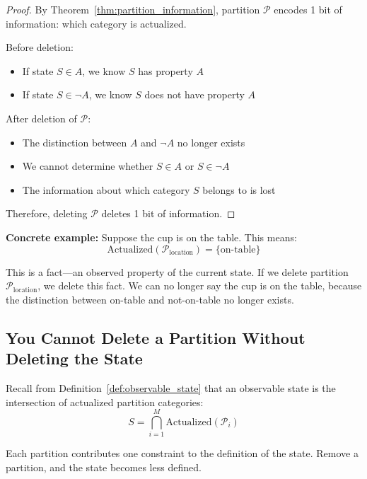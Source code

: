 \documentclass[twocolumn,10pt]{article}
\theoremstyle{definition}
\theoremstyle{remark}
\begin{document}
\begin{proof}
By Theorem~\ref{thm:partition_information}, partition $\mathcal{P}$ encodes 1 bit of information: which category is actualized.

Before deletion:
\begin{itemize}
\item If state $S \in A$, we know $S$ has property $A$
\item If state $S \in \neg A$, we know $S$ does not have property $A$
\end{itemize}

After deletion of $\mathcal{P}$:
\begin{itemize}
\item The distinction between $A$ and $\neg A$ no longer exists
\item We cannot determine whether $S \in A$ or $S \in \neg A$
\item The information about which category $S$ belongs to is lost
\end{itemize}

Therefore, deleting $\mathcal{P}$ deletes 1 bit of information.
\end{proof}

\noindent\textbf{Concrete example:} Suppose the cup is on the table. This means:
\begin{equation}
\text{Actualized}(\mathcal{P}_{\text{location}}) = \{\text{on-table}\}
\end{equation}

This is a fact—an observed property of the current state. If we delete partition $\mathcal{P}_{\text{location}}$, we delete this fact. We can no longer say the cup is on the table, because the distinction between on-table and not-on-table no longer exists.

\subsection{You Cannot Delete a Partition Without Deleting the State}

Recall from Definition~\ref{def:observable_state} that an observable state is the intersection of actualized partition categories:
\begin{equation}
S = \bigcap_{i=1}^{M} \text{Actualized}(\mathcal{P}_i)
\end{equation}

Each partition contributes one constraint to the definition of the state. Remove a partition, and the state becomes less defined.
\end{document}
